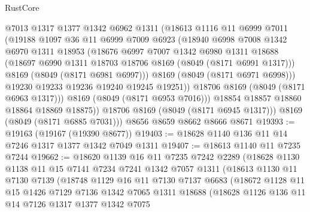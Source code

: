 \begin{lexlean}{RustCore}
\begin{coremodule}
                @7013
                @1317
                @1377
                @1342
                @6962
                @1311
                (@18613
                  @1116
                  @11
                  @6999
                  @7011
                  (@19188
                    @1097
                    @36
                    @11
                    @6999
                    @7009
                    @6923
                    (@18940
                      @6998
                      @7008
                      @1342
                      @6970
                      @1311
                      @18953
                      (@18676
                        @6997
                        @7007
                        @1342
                        @6980
                        @1311
                        @18688
                        (@18697 @6990 @1311 @18703 @18706 @8169 (@8049 (@8171 @6991 @1317)))
                        @8169
                        (@8049 (@8171 @6981 @6997)))
                      @8169
                      (@8049 (@8171 @6971 @6998)))
                    @19230
                    @19233
                    @19236
                    @19240
                    @19245
                    @19251))
                @18706
                @8169
                (@8049 (@8171 @6963 @1317)))
              @8169
              (@8049 (@8171 @6953 @7016)))
            @18854
            @18857
            @18860
            @18864
            @18869
            @18875))
        @18706
        @8169
        (@8049 (@8171 @6945 @1317)))
      @8169
      (@8049 (@8171 @6885 @7031)))
    @8656
    @8659
    @8662
    @8666
    @8671
@19393 := @19163 (@19167 (@19390 @8677))
@19403 := @18628 @1140 @136 @11 @14 @7246 @1317 @1377 @1342 @7049 @1311
@19407 := @18613 @1140 @11 @7235 @7244
@19662 := @18620
    @1139
    @16
    @11
    @7235
    @7242
    @2289
    (@18628
      @1130
      @1138
      @11
      @15
      @7141
      @7234
      @7241
      @1342
      @7057
      @1311
      (@18613
        @1130
        @11
        @7130
        @7139
        (@18748
          @1129
          @16
          @11
          @7130
          @7137
          @6683
          (@18672
            @1128
            @11
            @15
            @1426
            @7129
            @7136
            @1342
            @7065
            @1311
            @18688
            (@18628
              @1126
              @136
              @11
              @14
              @7126
              @1317
              @1377
              @1342
              @7075

\end{coremodule}
\end{lexlean}
